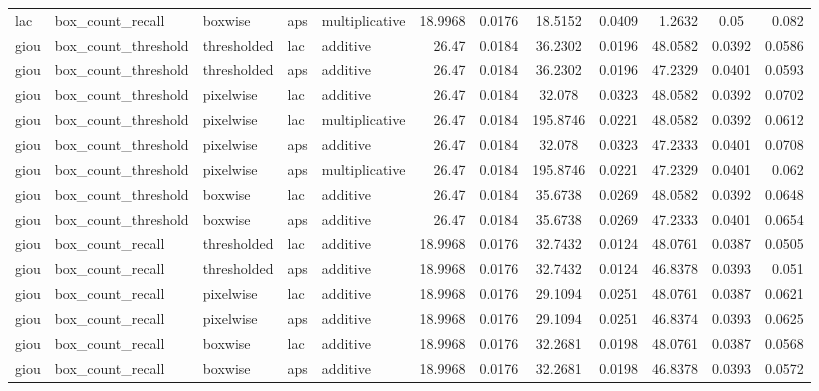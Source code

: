 \begin{table*}[htbp]
\begin{tabular}{@{}lllll rrcrrcr@{}}
lac & box\_count\_recall & boxwise & aps & multiplicative & 18.9968 & 0.0176 & 18.5152 & 0.0409 & 1.2632 & 0.05 & 0.082 \\
giou & box\_count\_threshold & thresholded & lac & additive & 26.47 & 0.0184 & 36.2302 & 0.0196 & 48.0582 & 0.0392 & 0.0586 \\
giou & box\_count\_threshold & thresholded & aps & additive & 26.47 & 0.0184 & 36.2302 & 0.0196 & 47.2329 & 0.0401 & 0.0593 \\
giou & box\_count\_threshold & pixelwise & lac & additive & 26.47 & 0.0184 & 32.078 & 0.0323 & 48.0582 & 0.0392 & 0.0702 \\
giou & box\_count\_threshold & pixelwise & lac & multiplicative & 26.47 & 0.0184 & 195.8746 & 0.0221 & 48.0582 & 0.0392 & 0.0612 \\
giou & box\_count\_threshold & pixelwise & aps & additive & 26.47 & 0.0184 & 32.078 & 0.0323 & 47.2333 & 0.0401 & 0.0708 \\
giou & box\_count\_threshold & pixelwise & aps & multiplicative & 26.47 & 0.0184 & 195.8746 & 0.0221 & 47.2329 & 0.0401 & 0.062 \\
giou & box\_count\_threshold & boxwise & lac & additive & 26.47 & 0.0184 & 35.6738 & 0.0269 & 48.0582 & 0.0392 & 0.0648 \\
giou & box\_count\_threshold & boxwise & aps & additive & 26.47 & 0.0184 & 35.6738 & 0.0269 & 47.2333 & 0.0401 & 0.0654 \\
giou & box\_count\_recall & thresholded & lac & additive & 18.9968 & 0.0176 & 32.7432 & 0.0124 & 48.0761 & 0.0387 & 0.0505 \\
giou & box\_count\_recall & thresholded & aps & additive & 18.9968 & 0.0176 & 32.7432 & 0.0124 & 46.8378 & 0.0393 & 0.051 \\
giou & box\_count\_recall & pixelwise & lac & additive & 18.9968 & 0.0176 & 29.1094 & 0.0251 & 48.0761 & 0.0387 & 0.0621 \\
giou & box\_count\_recall & pixelwise & aps & additive & 18.9968 & 0.0176 & 29.1094 & 0.0251 & 46.8374 & 0.0393 & 0.0625 \\
giou & box\_count\_recall & boxwise & lac & additive & 18.9968 & 0.0176 & 32.2681 & 0.0198 & 48.0761 & 0.0387 & 0.0568 \\
giou & box\_count\_recall & boxwise & aps & additive & 18.9968 & 0.0176 & 32.2681 & 0.0198 & 46.8378 & 0.0393 & 0.0572 \\
    \bottomrule
    \end{tabular}
    \end{table*}
    